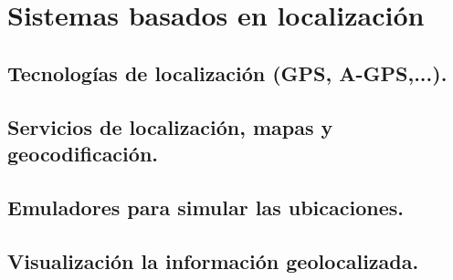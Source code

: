 \documentclass[a4paper,12pt,spanish]{sphinxmanual}
\begin{document}
\chapter{Sistemas basados en localización}
\label{index:sistemas-basados-en-localizacion}

\section{Tecnologías de localización (GPS, A-GPS,...).}
\label{index:tecnologias-de-localizacion-gps-a-gps}

\section{Servicios de localización, mapas y geocodificación.}
\label{index:servicios-de-localizacion-mapas-y-geocodificacion}

\section{Emuladores para simular las ubicaciones.}
\label{index:emuladores-para-simular-las-ubicaciones}

\section{Visualización la información geolocalizada.}
\label{index:visualizacion-la-informacion-geolocalizada}


\renewcommand{\indexname}{Índice}
\printindex
\end{document}

